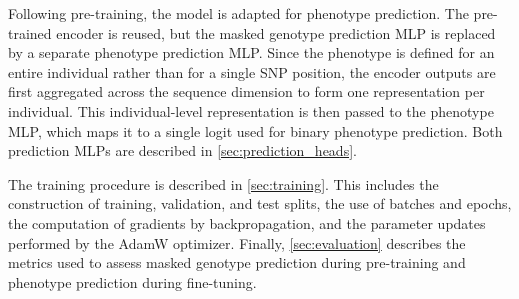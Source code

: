 Following pre-training, the model is adapted for phenotype prediction. The pre-trained encoder is reused, but the masked genotype prediction MLP is replaced by a separate phenotype prediction MLP. Since the phenotype is defined for an entire individual rather than for a single SNP position, the encoder outputs are first aggregated across the sequence dimension to form one representation per individual. This individual-level representation is then passed to the phenotype MLP, which maps it to a single logit used for binary phenotype prediction. Both prediction MLPs are described in \autoref{sec:prediction_heads}.

The training procedure is described in \autoref{sec:training}. This includes the construction of training, validation, and test splits, the use of batches and epochs, the computation of gradients by backpropagation, and the parameter updates performed by the AdamW optimizer. Finally, \autoref{sec:evaluation} describes the metrics used to assess masked genotype prediction during pre-training and phenotype prediction during fine-tuning.

